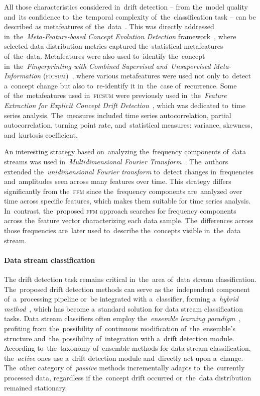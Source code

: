 All those characteristics considered in~drift detection -- from the~model quality and~its confidence to~the~temporal complexity of~the~classification task -- can be described as metafeatures of~the~data~\cite{komorniczak2024metafeatures}. This was directly addressed in~the~\textit{Meta-Feature-based Concept Evolution Detection} framework~\cite{guo2023meta}, where selected data distribution metrics captured the~statistical metafeatures of~the~data. Metafeatures were also used to~identify the~concept in~the~\textit{Fingerprinting with Combined Supervised and~Unsupervised Meta-Information} (\textsc{ficsum})~\cite{halstead2023combining}, where various metafeatures were used not only to~detect a~concept change but also to~re-identify it in~the~case of~recurrence. Some of~the~metafeatures used in~\textsc{ficsum} were previously used in~the~\textit{Feature Extraction for Explicit Concept Drift Detection}~\cite{cavalcante2016fedd}, which was dedicated to~time series analysis. The~measures included time series autocorrelation, partial autocorrelation, turning point rate, and~statistical measures: variance, skewness, and~kurtosis coefficient. 

An interesting strategy based on~analyzing the~frequency components of~data streams was used in~\textit{Multidimensional Fourier Transform}~\cite{da2017multidimensional}. The~authors extended the~\textit{unidimensional Fourier transform} to~detect changes in~frequencies and~amplitudes seen across many features over time. This strategy differs significantly from the~\textsc{ffm} since the~frequency components are~analyzed over time across specific features, which makes them suitable for time series analysis. In~contrast, the~proposed \textsc{ffm} approach searches for frequency components across the~feature vector characterizing each data sample. The~differences across those frequencies are~later used to~describe the~concepts visible in~the~data stream.

\paragraph{Data stream classification}

The drift detection task remains critical in~the~area of~data stream classification. The~proposed drift detection methods can serve as the~independent component of~a~processing pipeline or~be integrated with a~classifier, forming a~\emph{hybrid method}~\cite{wozniak2013hybrid}, which has become a~standard solution for data stream classification tasks.  Data stream classifiers often employ the~\emph{ensemble learning paradigm}~\cite{krawczyk2017ensemble}, profiting from the~possibility of~continuous modification of~the~ensemble's structure and~the~possibility of~integration with a~drift detection module. According to~the~taxonomy of~ensemble methods for data stream classification, the~\textit{active} ones use a~drift detection module and~directly act upon a~change. The~other category of~\textit{passive} methods incrementally adapts to~the~currently processed data, regardless if the~concept drift occurred or~the~data distribution remained stationary.

